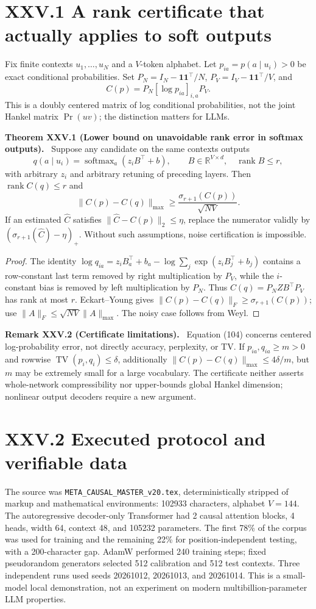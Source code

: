 \documentclass[11pt,a4paper,oneside]{book}
\newcommand{\R}{\mathbb R}\newcommand{\C}{\mathbb C}\newcommand{\Z}{\mathbb Z}\newcommand{\N}{\mathbb N}\newcommand{\Q}{\mathbb Q}
\newcommand{\one}{\mathbf 1}\newcommand{\ii}{\mathrm i}\newcommand{\dd}{\mathrm d}
\DeclareMathOperator{\rank}{rank}\DeclareMathOperator{\Tr}{Tr}
\newcommand{\statement}[3]{\par\medskip\noindent\textbf{#1 #2 (#3).}\ }
\begin{document}
\section*{XXV.1 A rank certificate that actually applies to soft outputs}
Fix finite contexts $u_1,\ldots,u_N$ and a $V$-token alphabet. Let $p_{ia}=p(a\mid u_i)>0$ be exact conditional probabilities. Set $P_N=I_N-\one\one^\top/N$, $P_V=I_V-\one\one^\top/V$, and
\begin{equation}C(p)=P_N[\log p_{ia}]_{i,a}P_V.\tag{103}\end{equation}
This is a doubly centered matrix of log conditional probabilities, not the joint Hankel matrix $\Pr(uv)$; the distinction matters for LLMs.
\statement{Theorem}{XXV.1}{Lower bound on unavoidable rank error in softmax outputs} Suppose any candidate on the same contexts outputs
\[q(a\mid u_i)=\operatorname{softmax}_a(z_iB^\top+b),\qquad B\in\R^{V\times d},\quad\rank B\le r,\]
with arbitrary $z_i$ and arbitrary retuning of preceding layers. Then $\rank C(q)\le r$ and
\begin{equation}\|C(p)-C(q)\|_{\max}\ge\frac{\sigma_{r+1}(C(p))}{\sqrt{NV}}.\tag{104}\end{equation}
If an estimated $\widehat C$ satisfies $\|\widehat C-C(p)\|_2\le\eta$, replace the numerator validly by $(\sigma_{r+1}(\widehat C)-\eta)_+$. Without such assumptions, noise certification is impossible.
\begin{proof}The identity $\log q_{ia}=z_iB_a^\top+b_a-\log\sum_j\exp(z_iB_j^\top+b_j)$ contains a row-constant last term removed by right multiplication by $P_V$, while the $i$-constant bias is removed by left multiplication by $P_N$. Thus $C(q)=P_NZB^\top P_V$ has rank at most $r$. Eckart--Young gives $\|C(p)-C(q)\|_F\ge\sigma_{r+1}(C(p))$; use $\|A\|_F\le\sqrt{NV}\|A\|_{\max}$. The noisy case follows from Weyl.\end{proof}
\statement{Remark}{XXV.2}{Certificate limitations} Equation (104) concerns centered log-probability error, not directly accuracy, perplexity, or TV. If $p_{ia},q_{ia}\ge m>0$ and rowwise $\operatorname{TV}(p_i,q_i)\le\delta$, additionally $\|C(p)-C(q)\|_{\max}\le4\delta/m$, but $m$ may be extremely small for a large vocabulary. The certificate neither asserts whole-network compressibility nor upper-bounds global Hankel dimension; nonlinear output decoders require a new argument.
\section*{XXV.2 Executed protocol and verifiable data}
The source was \texttt{META\_CAUSAL\_MASTER\_v20.tex}, deterministically stripped of markup and mathematical environments: 102933 characters, alphabet $V=144$. The autoregressive decoder-only Transformer had 2 causal attention blocks, 4 heads, width 64, context 48, and 105232 parameters. The first 78\% of the corpus was used for training and the remaining 22\% for position-independent testing, with a 200-character gap. AdamW performed 240 training steps; fixed pseudorandom generators selected 512 calibration and 512 test contexts. Three independent runs used seeds 20261012, 20261013, and 20261014. This is a small-model local demonstration, not an experiment on modern multibillion-parameter LLM properties.
\end{document}
